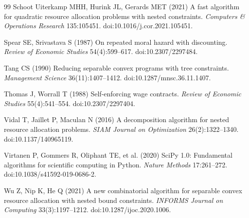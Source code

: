 \begin{thebibliography}{99}
Schoot Uiterkamp MHH, Hurink JL, Gerards MET (2021) A fast algorithm for quadratic resource allocation problems with nested constraints. \emph{Computers \& Operations Research} 135:105451. doi:10.1016/j.cor.2021.105451.

Spear SE, Srivastava S (1987) On repeated moral hazard with discounting. \emph{Review of Economic Studies} 54(4):599--617. doi:10.2307/2297484.

Tang CS (1990) Reducing separable convex programs with tree constraints. \emph{Management Science} 36(11):1407--1412. doi:10.1287/mnsc.36.11.1407.

Thomas J, Worrall T (1988) Self-enforcing wage contracts. \emph{Review of Economic Studies} 55(4):541--554. doi:10.2307/2297404.

Vidal T, Jaillet P, Maculan N (2016) A decomposition algorithm for nested resource allocation problems. \emph{SIAM Journal on Optimization} 26(2):1322--1340. doi:10.1137/140965119.

Virtanen P, Gommers R, Oliphant TE, et al. (2020) SciPy 1.0: Fundamental algorithms for scientific computing in Python. \emph{Nature Methods} 17:261--272. doi:10.1038/s41592-019-0686-2.

Wu Z, Nip K, He Q (2021) A new combinatorial algorithm for separable convex resource allocation with nested bound constraints. \emph{INFORMS Journal on Computing} 33(3):1197--1212. doi:10.1287/ijoc.2020.1006.
\end{thebibliography}
